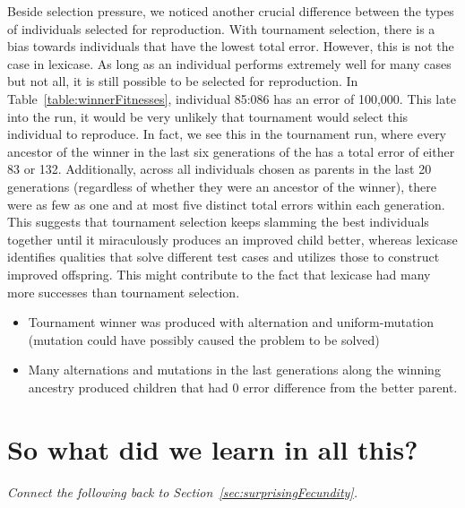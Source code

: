 Beside selection pressure, we noticed another crucial difference between the types of individuals 
selected for reproduction. With tournament selection, there is a bias towards individuals that 
have the lowest total error. However, this is not the case in lexicase.  As long as an individual 
performs extremely well for many cases but not all, it is still possible to be selected for 
reproduction. In Table~\ref{table:winnerFitnesses}, individual 85:086 has an error of 100,000. 
This late into the run, it would be very unlikely that tournament would select this individual to 
reproduce. In fact, we see this in the tournament run, where every ancestor of the winner in the
last six generations of the
has a total error of either 83 or 132. Additionally, across all individuals chosen
as parents in the last 20 generations (regardless of whether they were an ancestor of the winner), 
there were as few as one and at most five distinct total errors within each generation. 
This suggests that tournament selection keeps
slamming the best individuals together until it miraculously produces an improved child better, whereas 
lexicase identifies qualities that solve different test cases and utilizes those 
to construct improved offspring. This might contribute to the fact that lexicase had many more 
successes than tournament selection.

\begin{itemize}
	\item Tournament winner was produced with alternation and uniform-mutation (mutation could have possibly caused the problem to be solved)
	\item Many alternations and mutations in the last generations along the winning ancestry produced children that had 0 error difference from the better parent. 
\end{itemize}





\section{So what did we learn in all this?}
\label{sec:whatDidWeLearn}

\emph{Connect the following back to Section~\ref{sec:surprisingFecundity}.}

